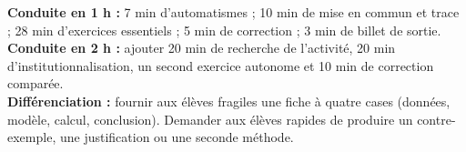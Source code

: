 \ifmxteacher
\begin{method}
\textbf{Conduite en 1 h :} 7 min d'automatismes ; 10 min de mise en commun et trace ; 28 min d'exercices essentiels ; 5 min de correction ; 3 min de billet de sortie.\\
\textbf{Conduite en 2 h :} ajouter 20 min de recherche de l'activité, 20 min d'institutionnalisation, un second exercice autonome et 10 min de correction comparée.\\
\textbf{Différenciation :} fournir aux élèves fragiles une fiche à quatre cases (données, modèle, calcul, conclusion). Demander aux élèves rapides de produire un contre-exemple, une justification ou une seconde méthode.
\end{method}
\fi
